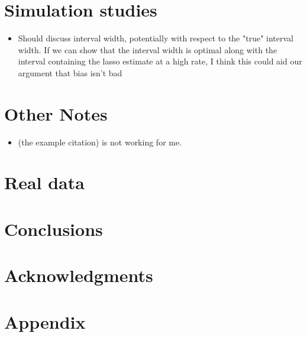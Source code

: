 \section{Simulation studies}
\label{Sec:sim}

\begin{itemize}
\item Should discuss interval width, potentially with respect to the "true" interval width. If we can show that the interval width is optimal along with the interval containing the lasso estimate at a high rate, I think this could aid our argument that bias isn't bad
\end{itemize}

\section{Other Notes}

\begin{itemize}
\item \cite{Tibshirani1996} (the example citation) is not working for me.
\end{itemize}

\section{Real data}

\section{Conclusions}

\section*{Acknowledgments}

\section*{Appendix}
